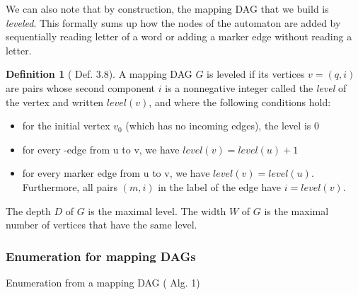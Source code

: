 \documentclass[12px]{article}
\theoremstyle{definition}
\newtheorem{definition}{Definition}
\begin{document}

        We can also note that by construction, the mapping DAG that we build is
        \textit{leveled}. This formally sums up how the nodes of the automaton
        are added by sequentially reading letter of a word or adding a marker
        edge without reading a letter.

        \begin{definition}[\cite{ICDT19} Def. 3.8]
          A mapping DAG $G$ is leveled if its vertices $v = (q, i)$ are pairs
          whose second component $i$ is a nonnegative integer called the
          \textit{level} of the vertex and written $level(v)$, and where the
          following conditions hold:
            \begin{itemize}
              \item for the initial vertex $v_0$ (which has no incoming edges),
                the level is $0$
              \item for every -edge from u to v, we have $level(v) = level(u) +
                1$
              \item for every marker edge from u to v, we have $level(v) =
                level(u)$. Furthermore, all pairs $(m, i)$ in the label of the
                edge have $i = level(v)$.
            \end{itemize}

          The depth $D$ of $G$ is the maximal level. The width $W$ of $G$ is
          the maximal number of vertices that have the same level.
        \end{definition}

      \subsubsection{Enumeration for mapping DAGs}



        \begin{algorithm}[H]
          \caption{Enumeration from a mapping DAG (\cite{ICDT19} Alg. 1)}%
          \label{alg:main_enum}
          \begin{algorithmic}[1]
              \Else{}
                \EndFor{}
              \EndIf{}
            \EndFunction{}
          \end{algorithmic}
        \end{algorithm}
\end{document}
